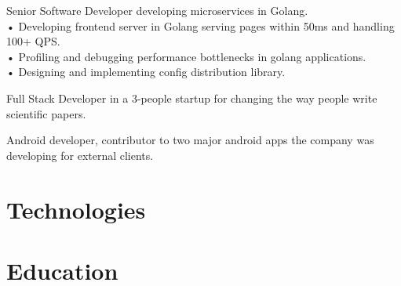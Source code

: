 \documentclass[11pt,a4paper]{moderncv-xetex}
\begin{document}
{
Senior Software Developer developing microservices in Golang.
\\
 • Developing frontend server in Golang serving pages within 50ms and handling 100+ QPS.
\\
 • Profiling and debugging performance bottlenecks in golang applications.
\\
 • Designing and implementing config distribution library.
}
    
{Full Stack Developer in a 3-people startup for changing the way people write scientific papers.}

{Android developer, contributor to two major android apps the company was developing for external clients.
}


\section{Technologies}


\section{Education}
\end{document}
